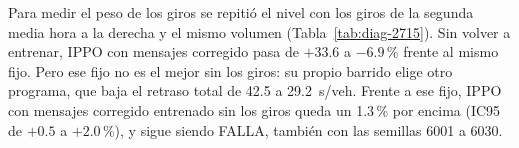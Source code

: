 Para medir el peso de los giros se repitió el nivel con los giros de la
segunda media hora a la derecha y el mismo volumen
(Tabla~\ref{tab:diag-2715}). Sin volver a entrenar, IPPO con mensajes
corregido pasa de $+33.6$ a $-6.9$\,\% frente al mismo fijo. Pero ese
fijo no es el mejor sin los giros: su propio barrido elige otro
programa, que baja el retraso total de 42.5 a 29.2~s/veh. Frente a ese
fijo, IPPO con mensajes corregido entrenado sin los giros queda un
1.3\,\% por encima (IC95 de $+0.5$ a $+2.0$\,\%), y sigue siendo FALLA,
también con las semillas 6001 a 6030.

